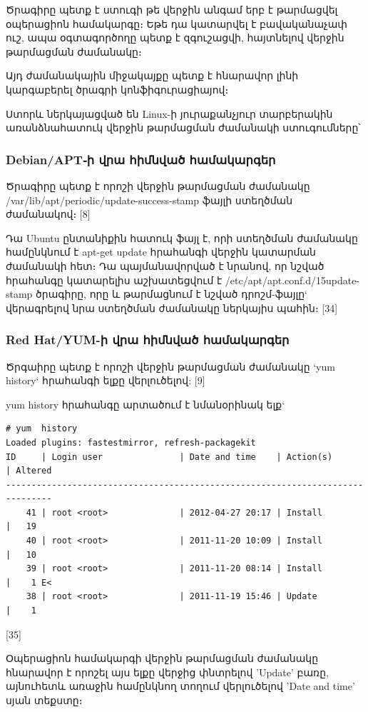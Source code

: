 \documentclass[a4paper,12pt]{article}
\begin{document}
\begin{sloppypar}
Ծրագիրը պետք է ստուգի թե վերջին անգամ երբ է թարմացվել
օպերացիոն համակարգը։
Եթե դա կատարվել է բավականաչափ ուշ, ապա օգտագործողը պետք է
զգուշացվի, հայտնելով վերջին թարմացման ժամանակը։

Այդ ժամանակային միջակայքը պետք է հնարավոր լինի կարգաբերել ծրագրի կոնֆիգուրացիայով։

Ստորև ներկայացված են Linux-ի յուրաքանչյուր տարբերակին առանձնահատուկ
վերջին թարմացման ժամանակի ստուգումները՝

\subsubsection{Debian/APT֊ի վրա հիմնված համակարգեր}

Ծրագիրը պետք է որոշի վերջին թարմացման ժամանակը
/var/lib/apt/periodic/update-success-stamp
ֆայլի ստեղծման ժամանակով։ [8]

Դա Ubuntu ընտանիքին հատուկ ֆայլ է, որի ստեղծման ժամանակը համընկնում է
apt-get update հրահանգի վերջին կատարման ժամանակի հետ։ Դա պայմանավորված է
նրանով, որ նշված հրահանգը կատարելիս աշխատեցվում է
/etc/apt/apt.conf.d/15update-stamp
ծրագիրը, որը և թարմացնում է նշված դրոշմ-ֆայլը` վերագրելով նրա
ստեղծման ժամանակը ներկայիս պահին։
[34]

\subsubsection{Red Hat/YUM-ի վրա հիմնված համակարգեր}

Ծրգաիրը պետք է որոշի վերջին թարմացման ժամանակը `yum history`
հրահանգի ելքը վերլուծելով: [9]

yum history հրահանգը արտածում է նմանօրինակ ելք`

\begin{lstlisting}[language={}]
# yum  history
Loaded plugins: fastestmirror, refresh-packagekit
ID     | Login user               | Date and time    | Action(s)      | Altered
-------------------------------------------------------------------------------
    41 | root <root>              | 2012-04-27 20:17 | Install        |   19   
    40 | root <root>              | 2011-11-20 10:09 | Install        |   10   
    39 | root <root>              | 2011-11-20 08:14 | Install        |    1 E<
    38 | root <root>              | 2011-11-19 15:46 | Update         |    1 
\end{lstlisting}
[35]

Օպերացիոն համակարգի վերջին թարմացման ժամանակը հնարավոր է որոշել
այս ելքը վերջից փնտրելով 'Update' բառը, այնուհետև
առաջին համընկնող տողում վերլուծելով 'Date and time' սյան տեքստը։


\end{sloppypar}
\end{document}

